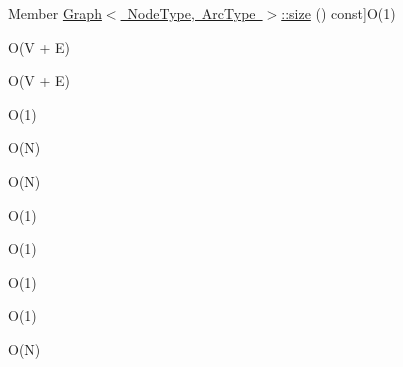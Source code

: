 \begin{DoxyRefList}
%
Member \mbox{\hyperlink{classGraph_af9593d4a5ff4274efaf429cb4f9e57cc}{Graph$<$ Node\+Type, Arc\+Type $>$\+:\+:size}} () const]O(1)  
\item[\label{BigOh__BigOh000090}%
\Hypertarget{BigOh__BigOh000090}%
Member \mbox{\hyperlink{classGraph_a1fe5121d6528fdea3f243321b3fa3a49}{Graph$<$ Node\+Type, Arc\+Type $>$\+:\+:to\+String}} () const]O(V + E)  
\item[\label{BigOh__BigOh000041}%
\Hypertarget{BigOh__BigOh000041}%
Member \mbox{\hyperlink{classGraph_af5a604e5e9e4d68dbc10b312e59f678f}{Graph$<$ Node\+Type, Arc\+Type $>$\+:\+:$\sim$\+Graph}} ()]O(V + E)  
\item[\label{BigOh__BigOh000104}%
\Hypertarget{BigOh__BigOh000104}%
Member \mbox{\hyperlink{classVector_ab901606bf3a8019c986f0cf9a9f298dc}{Vector$<$ Value\+Type $>$\+:\+:add}} (const Value\+Type \&value)]O(1)  
\item[\label{BigOh__BigOh000105}%
\Hypertarget{BigOh__BigOh000105}%
Member \mbox{\hyperlink{classVector_a7e05c14d67a60defeb6723b5704967a6}{Vector$<$ Value\+Type $>$\+:\+:add\+All}} (const Vector$<$ Value\+Type $>$ \&v)]O(\+N)  
\item[\label{BigOh__BigOh000106}%
\Hypertarget{BigOh__BigOh000106}%
Member \mbox{\hyperlink{classVector_a36067964c5c7f8b7934682f5c3be49c6}{Vector$<$ Value\+Type $>$\+:\+:add\+All}} (std\+::initializer\+\_\+list$<$ Value\+Type $>$ list)]O(\+N)  
\item[\label{BigOh__BigOh000107}%
\Hypertarget{BigOh__BigOh000107}%
Member \mbox{\hyperlink{classVector_a2bad145b40a82c36986f67610313658d}{Vector$<$ Value\+Type $>$\+:\+:back}} ()]O(1)  
\item[\label{BigOh__BigOh000108}%
\Hypertarget{BigOh__BigOh000108}%
Member \mbox{\hyperlink{classVector_adc761c91bdacd01bed5c96e25fd9486a}{Vector$<$ Value\+Type $>$\+:\+:back}} () const]O(1)  
\item[\label{BigOh__BigOh000155}%
\Hypertarget{BigOh__BigOh000155}%
Member \mbox{\hyperlink{classVector_a0c62c15c8ed609e7e5e9518cf5f5c712}{Vector$<$ Value\+Type $>$\+:\+:begin}} () const]O(1)  
\item[\label{BigOh__BigOh000109}%
\Hypertarget{BigOh__BigOh000109}%
Member \mbox{\hyperlink{classVector_ac8bb3912a3ce86b15842e79d0b421204}{Vector$<$ Value\+Type $>$\+:\+:clear}} ()]O(1)  
\item[\label{BigOh__BigOh000110}%
\Hypertarget{BigOh__BigOh000110}%
Member \mbox{\hyperlink{classVector_a6fbc1a150987e7e5320d244a3baeb560}{Vector$<$ Value\+Type $>$\+:\+:contains}} (const Value\+Type \&value) const]O(\+N)  

\end{DoxyRefList}
